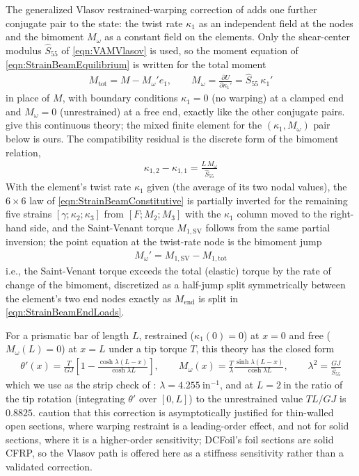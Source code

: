 \documentclass[10pt]{article}
\newcommand{\pp}[2]{\frac{\partial #1}{\partial #2}}
\newcommand{\beq}{\begin{equation}\begin{aligned}}
\newcommand{\eeq}{\end{aligned}\end{equation}}
\newcommand{\tn}[1]{\textrm{#1}}
\begin{document}
The generalized Vlasov restrained-warping correction of \citet[Eq.~(5)]{Yu2005b} adds one further conjugate pair to the state: the twist rate $\kappa_1$ as an independent field at the nodes and the bimoment $M_\omega$ as a constant field on the elements.
Only the shear-center modulus $\hat S_{55}$ of \autoref{eqn:VAMVlasov} is used, so the moment equation of \autoref{eqn:StrainBeamEquilibrium} is written for the total moment
\beq
M_{\tn{tot}} = M - M_\omega' e_1, \qquad
M_\omega = \pp{U}{\kappa_1'} = \hat S_{55}\,\kappa_1'
\label{eqn:StrainBeamBimoment}
\eeq
in place of $M$, with boundary conditions $\kappa_1=0$ (no warping) at a clamped end and $M_\omega=0$ (unrestrained) at a free end, exactly like the other conjugate pairs.
\citet{Yu2005b} give this continuous theory; the mixed finite element for the $(\kappa_1,M_\omega)$ pair below is ours.
The compatibility residual is the discrete form of the bimoment relation,
\beq
\kappa_{1,2}-\kappa_{1,1} = \frac{L\,M_\omega}{\hat S_{55}}
\label{eqn:StrainBeamWarpingCompatibility}
\eeq
With the element's twist rate $\kappa_1$ given (the average of its two nodal values), the $6\times6$ law of \autoref{eqn:StrainBeamConstitutive} is partially inverted for the remaining five strains $[\gamma;\kappa_2;\kappa_3]$ from $[F;M_2;M_3]$ with the $\kappa_1$ column moved to the right-hand side, and the Saint-Venant torque $M_{1,\tn{SV}}$ follows from the same partial inversion; the point equation at the twist-rate node is the bimoment jump
\beq
M_\omega' = M_{1,\tn{SV}} - M_{1,\tn{tot}}
\label{eqn:StrainBeamBimomentJump}
\eeq
i.e., the Saint-Venant torque exceeds the total (elastic) torque by the rate of change of the bimoment, discretized as a half-jump split symmetrically between the element's two end nodes exactly as $M_\tn{end}$ is split in \autoref{eqn:StrainBeamEndLoads}.

For a prismatic bar of length $L$, restrained ($\kappa_1(0)=0$) at $x=0$ and free ($M_\omega(L)=0$) at $x=L$ under a tip torque $T$, this theory has the closed form
\beq
\theta'(x) = \frac{T}{GJ}\left[1-\frac{\cosh\lambda(L-x)}{\cosh\lambda L}\right], \qquad
M_\omega(x) = \frac{T}{\lambda}\frac{\sinh\lambda(L-x)}{\cosh\lambda L}, \qquad
\lambda^2 = \frac{GJ}{\hat S_{55}}
\label{eqn:StrainBeamRestrainedWarping}
\eeq
which we use as the strip check of \citet[Table~7.9]{Hodges2006}: $\lambda=4.255~\tn{in}^{-1}$, and at $L=2~\tn{in}$ the ratio of the tip rotation (integrating $\theta'$ over $[0,L]$) to the unrestrained value $TL/GJ$ is $0.8825$.
\citet{Yu2005b} caution that this correction is asymptotically justified for thin-walled open sections, where warping restraint is a leading-order effect, and not for solid sections, where it is a higher-order sensitivity; DCFoil's foil sections are solid \ac{CFRP}, so the Vlasov path is offered here as a stiffness sensitivity rather than a validated correction.
\end{document}
